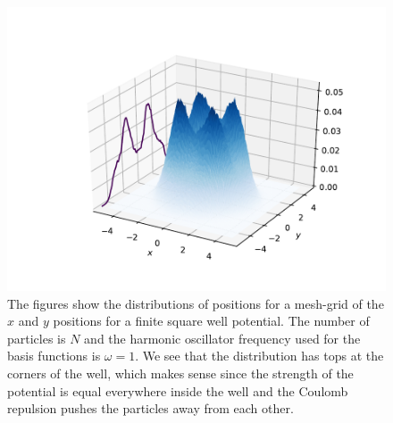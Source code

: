 \documentclass[../main.tex]{subfiles}
\begin{document}
\begin{figure}[!ht]
\centering
\includegraphics[width=\linewidth]{figures/densityFSW/density3D_FSW_N6_Omega1_2d_BF45}
\caption{The figures show the distributions of positions for a mesh-grid of the $x$ and $y$ positions for a finite square well potential. The number of particles is $N$ and the harmonic oscillator frequency used for the basis functions is $\omega=1$. We see that the distribution has tops at the corners of the well, which makes sense since the strength of the potential is equal everywhere inside the well and the Coulomb repulsion pushes the particles away from each other.} \label{fig:FSW_density3D}
\end{figure}
\end{document}
